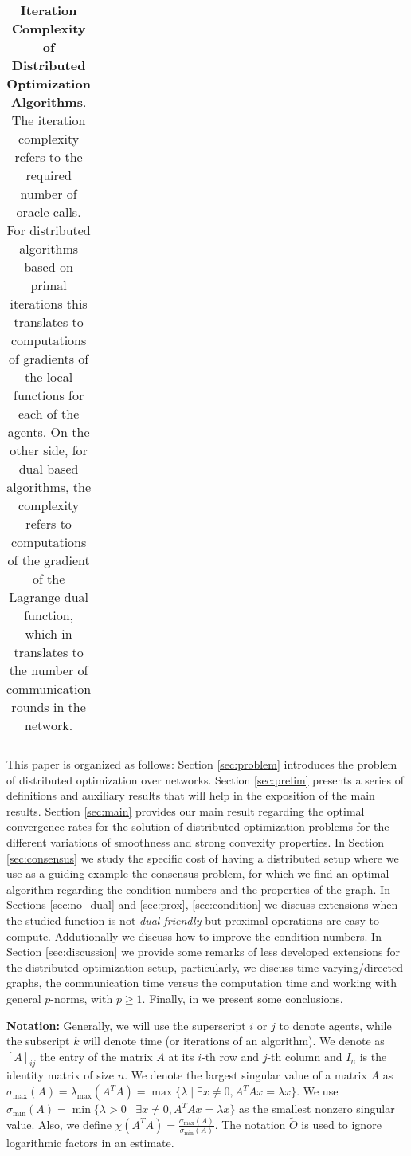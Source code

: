 \documentclass[final]{siamart1116}
\numberwithin{theorem}{section}
\begin{document}
\begin{table}[ht]
{\begin{tabular}{|c|C{1.5cm}|c|c|c|c|}
	\end{tabular}
	}
	\caption{\textbf{Iteration Complexity of Distributed Optimization Algorithms}. The iteration complexity refers to the required number of oracle calls. For distributed algorithms based on primal iterations this translates to computations of gradients of the local functions for each of the agents. On the other side, for dual based algorithms, the complexity refers to computations of the gradient of the Lagrange dual function, which in translates to the number of communication rounds in the network. }
	\label{tab:summary_other}
	\end{table}
	
	This paper is organized as follows: Section \ref{sec:problem} introduces the problem of distributed optimization over networks. Section \ref{sec:prelim} presents a series of definitions and auxiliary results that will help in the exposition of the main results. Section \ref{sec:main} provides our main result regarding the optimal convergence rates for the solution of distributed optimization problems for the different variations of smoothness and strong convexity properties. In Section \ref{sec:consensus} we study the specific cost of having a distributed setup where we use as a guiding example the consensus problem, for which we find an optimal algorithm regarding the condition numbers and the properties of the graph. In Sections \ref{sec:no_dual} and \ref{sec:prox}, \ref{sec:condition} we discuss extensions when the studied function is not \textit{dual-friendly} but proximal operations are easy to compute. Addutionally we discuss how to improve the condition numbers. In Section \ref{sec:discussion} we provide some remarks of less developed extensions for the distributed optimization setup, particularly, we discuss time-varying/directed graphs, the communication time versus the computation time and working with general $p$-norms, with $p\geq1$. Finally, in we present some conclusions.
	
	\vspace{1em}
	\noindent\textbf{Notation: }
	Generally, we will use the superscript $i$ or $j$ to denote agents, while the subscript $k$ will denote time (or iterations of an algorithm). We denote as $[A]_{ij}$ the entry of the matrix $A$ at its $i$-th row and $j$-th column and $I_{n}$ is the identity matrix of size $n$. We denote the largest singular value of a matrix $A$ as $\sigma_{\max}(A) = \lambda_{\max}(A^TA) = \max \{\lambda \mid \exists x \neq 0, A^TAx = \lambda x \}$. We use $\sigma_{\min}(A) = \min \{\lambda >0 \mid \exists x \neq 0, A^TAx = \lambda x \}$ {as the smallest nonzero singular value}. Also, we define $\chi(A^TA) = \frac{\sigma_{\max}{(A)}}{\sigma_{\min}{(A)}}$. The notation $\tilde{O}$ is used to ignore logarithmic factors in an estimate.
	
\end{document}
